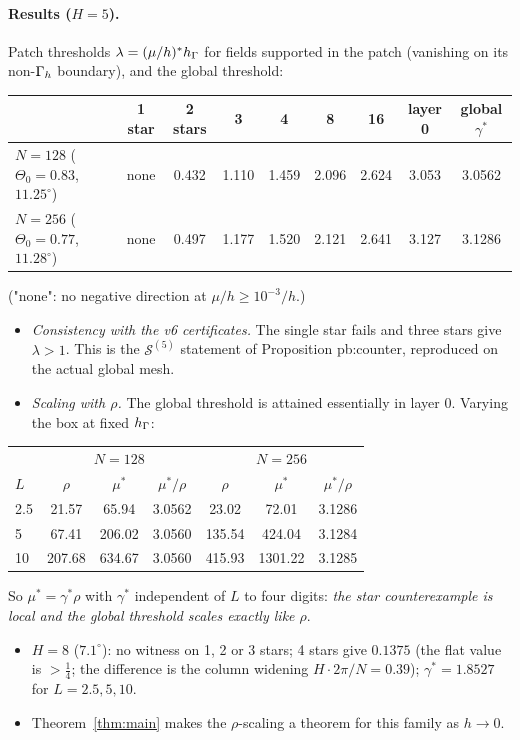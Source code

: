 \documentclass[11pt]{article}
\theoremstyle{remark}\newtheorem{remark}[theorem]{Remark}
\newcommand{\cS}{\mathcal S}\renewcommand{\div}{\operatorname{div}}
\begin{document}
\paragraph{Results ($H=5$).} Patch thresholds $\lambda=(\mu/h)^\ast h_\Gamma$ for fields supported in the patch (vanishing on its
non-$\Gamma_h$ boundary), and the global threshold:
\begin{center}\small\begin{tabular}{lcccccccc}
\toprule
 & 1 star & 2 stars & 3 & 4 & 8 & 16 & layer 0 & \textbf{global} $\gamma^\ast$\\
\midrule
$N=128$ ($\Theta_0=0.83$, $11.25^\circ$) & none & 0.432 & 1.110 & 1.459 & 2.096 & 2.624 & 3.053 & 3.0562\\
$N=256$ ($\Theta_0=0.77$, $11.28^\circ$) & none & 0.497 & 1.177 & 1.520 & 2.121 & 2.641 & 3.127 & 3.1286\\
\bottomrule
\end{tabular}\end{center}
("none": no negative direction at $\mu/h\ge10^{-3}/h$.)
\begin{itemize}
\item \emph{Consistency with the v6 certificates.} The single star fails and three stars give $\lambda>1$. This is the
  $\cS^{(5)}$ statement of Proposition pb:counter, reproduced on the actual global mesh.
\item \emph{Scaling with $\rho$.} The global threshold is attained essentially in layer 0. Varying the box at fixed $h_\Gamma$:
\end{itemize}
\begin{center}\small\begin{tabular}{lccc|ccc}
\toprule
 & \multicolumn{3}{c|}{$N=128$} & \multicolumn{3}{c}{$N=256$}\\
$L$ & $\rho$ & $\mu^\ast$ & $\mu^\ast/\rho$ & $\rho$ & $\mu^\ast$ & $\mu^\ast/\rho$\\
\midrule
2.5 & 21.57 & 65.94 & 3.0562 & 23.02 & 72.01 & 3.1286\\
5 & 67.41 & 206.02 & 3.0560 & 135.54 & 424.04 & 3.1284\\
10 & 207.68 & 634.67 & 3.0560 & 415.93 & 1301.22 & 3.1285\\
\bottomrule
\end{tabular}\end{center}
So $\mu^\ast=\gamma^\ast\rho$ with $\gamma^\ast$ independent of $L$ to four digits: \emph{the star counterexample is local and
the global threshold scales exactly like $\rho$}.
\begin{itemize}
\item $H=8$ ($7.1^\circ$): no witness on 1, 2 or 3 stars; 4 stars give $0.1375$ (the flat value is $>\frac14$; the difference
  is the column widening $H\cdot2\pi/N=0.39$); $\gamma^\ast=1.8527$ for $L=2.5,5,10$.
\item Theorem~\ref{thm:main} makes the $\rho$-scaling a theorem for this family as $h\to0$.
\end{itemize}
\end{document}

